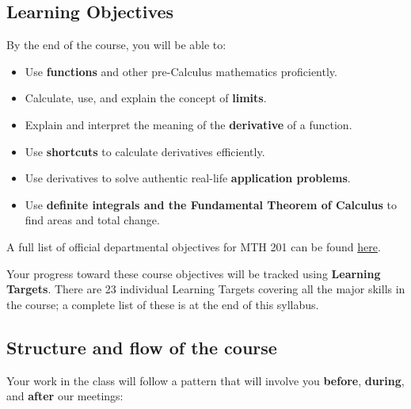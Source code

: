 \documentclass[]{article}
\providecommand{\tightlist}{%
  \setlength{\itemsep}{0pt}\setlength{\parskip}{0pt}}
\begin{document}
\hypertarget{learning-objectives}{%
\subsection{Learning Objectives}\label{learning-objectives}}

By the end of the course, you will be able to:

\begin{itemize}
\tightlist
\item
  Use \textbf{functions} and other pre-Calculus mathematics
  proficiently.
\item
  Calculate, use, and explain the concept of \textbf{limits}.
\item
  Explain and interpret the meaning of the \textbf{derivative} of a
  function.
\item
  Use \textbf{shortcuts} to calculate derivatives efficiently.
\item
  Use derivatives to solve authentic real-life \textbf{application
  problems}.
\item
  Use \textbf{definite integrals and the Fundamental Theorem of
  Calculus} to find areas and total change.
\end{itemize}

A full list of official departmental objectives for MTH 201 can be found
\href{https://www.gvsu.edu/cms4/asset/9A420BCF-BA9E-0845-91754145EA82C51F/sor_descriptions_objectives__topics_for_faculty_updated_12-11-19.pdf}{here}.

Your progress toward these course objectives will be tracked using
\textbf{Learning Targets}. There are 23 individual Learning Targets
covering all the major skills in the course; a complete list of these is
at the end of this syllabus.

\hypertarget{structure-and-flow-of-the-course}{%
\subsection{Structure and flow of the
course}\label{structure-and-flow-of-the-course}}

Your work in the class will follow a pattern that will involve you
\textbf{before}, \textbf{during}, and \textbf{after} our meetings:
\end{document}
